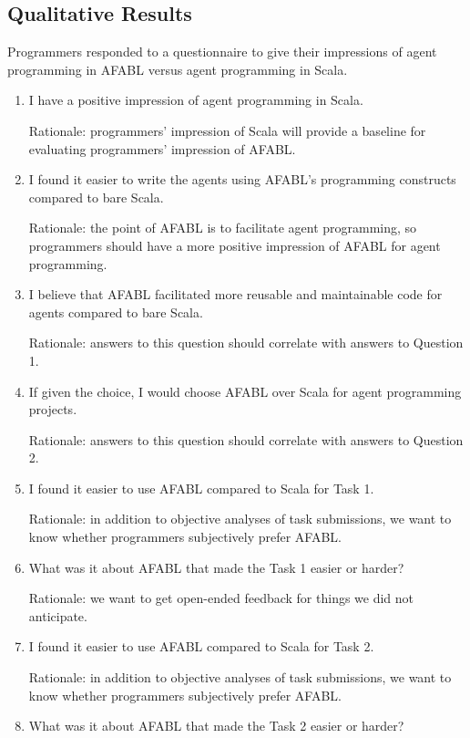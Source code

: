 \subsection{Qualitative Results}

Programmers responded to a questionnaire to give their impressions of agent programming in AFABL versus agent programming in Scala.

\begin{enumerate}
\item I have a positive impression of agent programming in Scala.

Rationale: programmers’ impression of Scala will provide a baseline for evaluating
programmers’ impression of AFABL.

\item I found it easier to write the agents using AFABL’s programming constructs compared to bare Scala.

Rationale: the point of AFABL is to facilitate agent programming, so programmers should have a more positive impression of AFABL for agent programming.

\item I believe that AFABL facilitated more reusable and maintainable code for agents compared to bare Scala.

Rationale: answers to this question should correlate with answers to Question 1.

\item If given the choice, I would choose AFABL over Scala for agent programming projects.

Rationale: answers to this question should correlate with answers to Question 2.

\item I found it easier to use AFABL compared to Scala for Task 1.

  Rationale: in addition to objective analyses of task submissions, we want to know whether programmers subjectively prefer AFABL.

\item What was it about AFABL that made the Task 1 easier or harder?

Rationale: we want to get open-ended feedback for things we did not anticipate.

\item I found it easier to use AFABL compared to Scala for Task 2.

Rationale: in addition to objective analyses of task submissions, we want to know whether programmers subjectively prefer AFABL.

\item What was it about AFABL that made the Task 2 easier or harder?

\end{enumerate}



